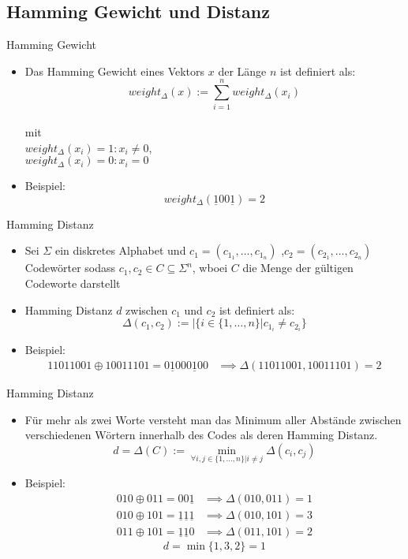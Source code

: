 \documentclass[11pt%
,aspectratio=169%
]{beamer}
\begin{document}
\subsection{Hamming Gewicht und Distanz}
\begin{frame}{Hamming Gewicht}
	\begin{itemize}
		\item Das Hamming Gewicht eines Vektors $x$ der Länge $n$ ist definiert als:
		       \[ weight_{\Delta}(x):= \sum_{i=1}^n weight_{\Delta}(x_i)  \]
		       \\mit\\ $weight_{\Delta}(x_i) = 1: x_i \neq 0$, \\$weight_{\Delta}(x_i) =0 : x_i = 0$ 
     	\item Beispiel:
					$$
					weight_{\Delta}(\underline{1}00\underline{1})  = 2
					$$
	\end{itemize}
\end{frame}



\begin{frame}{Hamming Distanz}
	\begin{itemize}
		\item Sei $\Sigma$ ein diskretes Alphabet und $c_1=(c_{1_1},\ldots,c_{1_n})$ ,$c_2=(c_{2_1},\ldots,c_{2_n})$ Codewörter sodass $c_1, c_2 \in C\subseteq\Sigma^n$, wboei $C$ die Menge der gültigen Codeworte darstellt
		\item Hamming Distanz $d$ zwischen $c_1$ und $c_2$ ist definiert als: 
		\[\Delta(c_1,c_2):=|\{i \in \{1,\ldots,n\}| c_{1_i}\neq c_{2_i} \}
		\]
		\item Beispiel:
			\begin{align*}
		        11011001\oplus 10011101 = 0\underline{1}000\underline{1}00 &\implies \Delta(11011001,10011101) = 2
		    \end{align*}
	\end{itemize}
\end{frame}

\begin{frame}{Hamming Distanz}
	\begin{itemize}
		\item Für mehr als zwei Worte versteht man das Minimum aller Abstände zwischen verschiedenen Wörtern innerhalb des Codes als deren Hamming Distanz.
		\[d=\Delta(C):= \min_{\forall i,j \in \{1,\ldots,n\}|i\neq j}\Delta(c_i,c_j)\]
		\item Beispiel:
		\begin{align*}
		    010\oplus 011 = 00\underline{1} &\implies \Delta(010,011) = 1\\
		    010\oplus 101 = \underline{1}\underline{1}\underline{1} &\implies \Delta(010,101) = 3\\
		    011\oplus 101 = \underline{1}\underline{1}0 &\implies \Delta(011,101) = 2
		\end{align*}
		$$ 
		d=\min\{1,3,2\}=1
		$$
	\end{itemize}
\end{frame}
\end{document}
